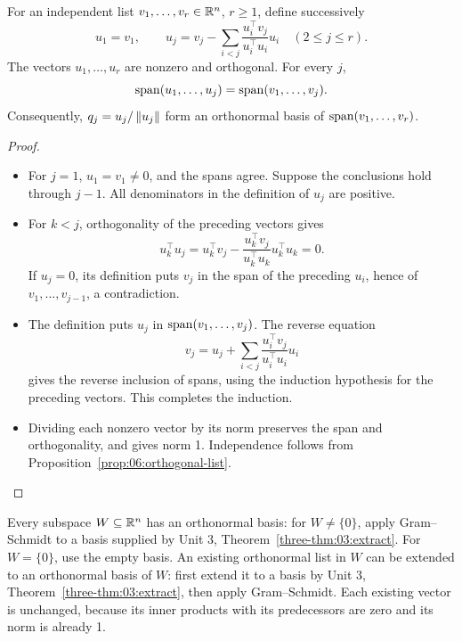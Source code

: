 \begin{theorem}\label{thm:06:gs}
For an independent list \(v_1,\ldots,v_r\in\mathbb R^n\), \(r\geqslant1\), define successively
\[
u_1=v_1,\qquad
u_j=v_j-\sum_{i<j}\frac{u_i^\top v_j}{u_i^\top u_i}u_i
\quad(2\leqslant j\leqslant r).
\]
The vectors \(u_1,\ldots,u_r\) are nonzero and orthogonal. For every \(j\),
\[
\operatorname{span}(u_1,\ldots,u_j)=\operatorname{span}(v_1,\ldots,v_j).
\]
Consequently, \(q_j=u_j/\left\lVert u_j\right\rVert\) form an orthonormal basis of
\(\operatorname{span}(v_1,\ldots,v_r)\).
\end{theorem}
\begin{proof}
\begin{itemize}
\item For \(j=1\), \(u_1=v_1\ne0\), and the spans agree.
  Suppose the conclusions hold through \(j-1\). All denominators
  in the definition of \(u_j\) are positive.
\item For \(k<j\), orthogonality of the preceding vectors gives
  \[
  u_k^\top u_j=u_k^\top v_j
  -\frac{u_k^\top v_j}{u_k^\top u_k}u_k^\top u_k=0.
  \]
  If \(u_j=0\), its definition puts \(v_j\) in the span of the
  preceding \(u_i\), hence of \(v_1,\ldots,v_{j-1}\), a contradiction.
\item The definition puts \(u_j\) in \(\operatorname{span}(v_1,\ldots,v_j)\).
  The reverse equation
  \[
  v_j=u_j+\sum_{i<j}\frac{u_i^\top v_j}{u_i^\top u_i}u_i
  \]
  gives the reverse inclusion of spans, using the induction hypothesis
  for the preceding vectors. This completes the induction.
\item Dividing each nonzero vector by its norm preserves the span and
  orthogonality, and gives norm 1. Independence follows from
  Proposition~\ref{prop:06:orthogonal-list}.
\end{itemize}
\end{proof}

Every subspace \(W\subseteq\mathbb R^n\) has an
orthonormal basis: for \(W\ne\{0\}\), apply Gram--Schmidt to a basis
supplied by Unit 3, Theorem~\ref{three-thm:03:extract}.
For \(W=\{0\}\), use the empty basis.
An existing orthonormal list in \(W\) can be extended to an orthonormal
basis of \(W\): first extend it to a basis by Unit 3,
Theorem~\ref{three-thm:03:extract}, then apply Gram--Schmidt.
Each existing vector is unchanged, because its inner products with its
predecessors are zero and its norm is already 1.

